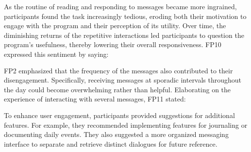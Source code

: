  As the routine of reading and responding to messages became more ingrained, participants found the task increasingly tedious, eroding both their motivation to engage with the program and their perception of its utility. Over time, the diminishing returns of the repetitive interactions led participants to question the program's usefulness, thereby lowering their overall responsiveness. FP10 expressed this sentiment by saying:





FP2 emphasized that the frequency of the messages also contributed to their disengagement. Specifically, receiving messages at sporadic intervals throughout the day could become overwhelming rather than helpful. Elaborating on the experience of interacting with several messages, FP11 stated:


To enhance user engagement, participants provided suggestions for additional features. For example, they recommended implementing features for journaling or documenting daily events. They also suggested a more organized messaging interface to separate and retrieve distinct dialogues for future reference.



